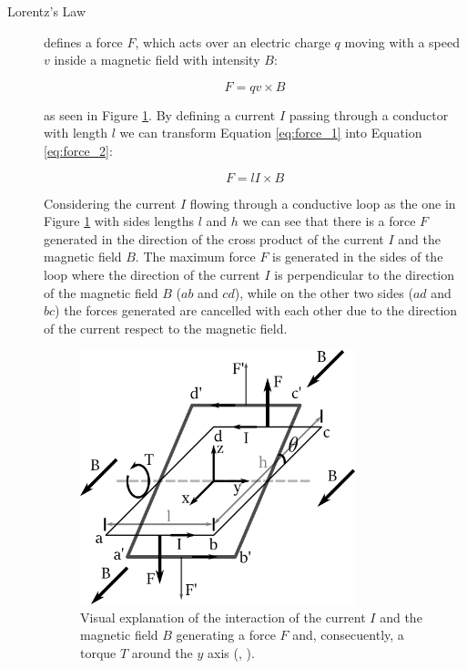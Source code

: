 \begin{description}



\item[Lorentz's Law] defines a force $F$, which acts over an electric charge $q$ moving with a speed $v$ inside a magnetic field with intensity $B$:

\begin{equation}
	\label{eq:force_1}
	F = q v \times B
\end{equation}

as seen in Figure \ref{fig:lorentz_law}. By defining a current $I$ passing through a conductor with length $l$ we can transform Equation \ref{eq:force_1} into Equation \ref{eq:force_2}:

\begin{equation}
	\label{eq:force_2}
	F = l I \times B
\end{equation}

Considering the current $I$ flowing through a conductive loop as the one in Figure \ref{fig:lorentz_law} with sides lengths $l$ and $h$ we can see that there is a force $F$ generated in the direction of the cross product of the current $I$ and the magnetic field $B$. The maximum force $F$ is generated in the sides of the loop where the direction of the current $I$ is perpendicular to the direction of the magnetic field $B$ ($ab$ and $cd$), while on the other two sides ($ad$ and $bc$) the forces generated are cancelled with each other due to the direction of the current respect to the magnetic field.

\begin{figure}[htbp]
\centering
\includegraphics[width=8cm]{Images/lorentz_law.png} 
\caption[Lorentz's Law Diagram]{Visual explanation of the interaction of the current $I$ and the magnetic field $B$ generating a force $F$ and, consecuently, a torque $T$ around the $y$ axis (\citeauthor{sistemi_di_controllo:2007}, \citeyear{sistemi_di_controllo:2007}).}
\label{fig:lorentz_law}
\end{figure}


\end{description}
